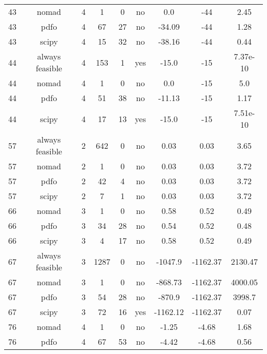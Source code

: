 \begin{scriptsize}
\begin{center}
\begin{longtable}{ccccccccc}
 43 &           nomad &  4 &      1 &      0 &      no &         0.0 &         -44 &     2.45\\
 43 &            pdfo &  4 &     67 &     27 &      no &      -34.09 &         -44 &     1.28\\
 43 &           scipy &  4 &     15 &     32 &      no &      -38.16 &         -44 &     0.44\\
 44 & always feasible &  4 &    153 &      1 &     yes &       -15.0 &         -15 & 7.37e-10\\
 44 &           nomad &  4 &      1 &      0 &      no &         0.0 &         -15 &      5.0\\
 44 &            pdfo &  4 &     51 &     38 &      no &      -11.13 &         -15 &     1.17\\
 44 &           scipy &  4 &     17 &     13 &     yes &       -15.0 &         -15 & 7.51e-10\\
 57 & always feasible &  2 &    642 &      0 &      no &        0.03 &        0.03 &     3.65\\
 57 &           nomad &  2 &      1 &      0 &      no &        0.03 &        0.03 &     3.72\\
 57 &            pdfo &  2 &     42 &      4 &      no &        0.03 &        0.03 &     3.72\\
 57 &           scipy &  2 &      7 &      1 &      no &        0.03 &        0.03 &     3.72\\
 66 &           nomad &  3 &      1 &      0 &      no &        0.58 &        0.52 &     0.49\\
 66 &            pdfo &  3 &     34 &     28 &      no &        0.54 &        0.52 &     0.48\\
 66 &           scipy &  3 &      4 &     17 &      no &        0.58 &        0.52 &     0.49\\
 67 & always feasible &  3 &   1287 &      0 &      no &     -1047.9 &    -1162.37 &  2130.47\\
 67 &           nomad &  3 &      1 &      0 &      no &     -868.73 &    -1162.37 &  4000.05\\
 67 &            pdfo &  3 &     54 &     28 &      no &      -870.9 &    -1162.37 &   3998.7\\
 67 &           scipy &  3 &     72 &     16 &     yes &    -1162.12 &    -1162.37 &     0.07\\
 76 &           nomad &  4 &      1 &      0 &      no &       -1.25 &       -4.68 &     1.68\\
 76 &            pdfo &  4 &     67 &     53 &      no &       -4.42 &       -4.68 &     0.56\\

\end{longtable}
\end{center}
\end{scriptsize}

